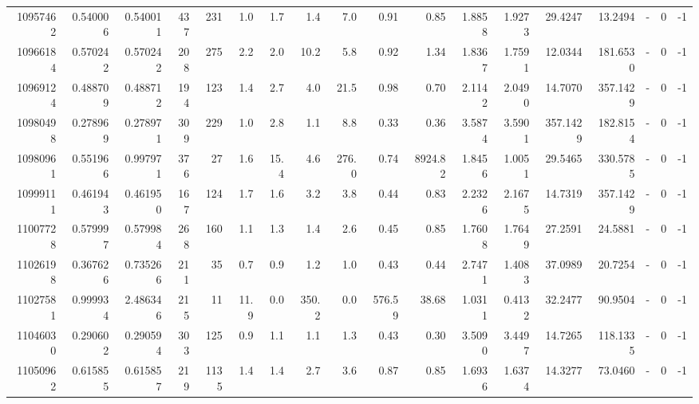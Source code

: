 \begin{tabular}{rrrrrrrrrrrrrrrlrr}
  10957462 & 0.540006 &   0.540011 &  437 &  231 &      1.0 &      1.7 &     1.4 &      7.0 &       0.91 &        0.85 &  1.8858 &  1.9273 &   29.4247 &   13.2494 &             - &        0 &         -1 \\
  10966184 & 0.570242 &   0.570242 &  208 &  275 &      2.2 &      2.0 &    10.2 &      5.8 &       0.92 &        1.34 &  1.8367 &  1.7591 &   12.0344 &  181.6530 &             - &        0 &         -1 \\
  10969124 & 0.488709 &   0.488712 &  194 &  123 &      1.4 &      2.7 &     4.0 &     21.5 &       0.98 &        0.70 &  2.1142 &  2.0490 &   14.7070 &  357.1429 &             - &        0 &         -1 \\
  10980498 & 0.278969 &   0.278971 &  309 &  229 &      1.0 &      2.8 &     1.1 &      8.8 &       0.33 &        0.36 &  3.5874 &  3.5901 &  357.1429 &  182.8154 &             - &        0 &         -1 \\
  10980961 & 0.551966 &   0.997971 &  376 &   27 &      1.6 &     15.4 &     4.6 &    276.0 &       0.74 &     8924.82 &  1.8456 &  1.0051 &   29.5465 &  330.5785 &             - &        0 &         -1 \\
  10999111 & 0.461943 &   0.461950 &  167 &  124 &      1.7 &      1.6 &     3.2 &      3.8 &       0.44 &        0.83 &  2.2326 &  2.1675 &   14.7319 &  357.1429 &             - &        0 &         -1 \\
  11007728 & 0.579997 &   0.579984 &  268 &  160 &      1.1 &      1.3 &     1.4 &      2.6 &       0.45 &        0.85 &  1.7608 &  1.7649 &   27.2591 &   24.5881 &             - &        0 &         -1 \\
  11026198 & 0.367626 &   0.735266 &  211 &   35 &      0.7 &      0.9 &     1.2 &      1.0 &       0.43 &        0.44 &  2.7471 &  1.4083 &   37.0989 &   20.7254 &             - &        0 &         -1 \\
  11027581 & 0.999934 &   2.486346 &  215 &   11 &     11.9 &      0.0 &   350.2 &      0.0 &     576.59 &       38.68 &  1.0311 &  0.4132 &   32.2477 &   90.9504 &             - &        0 &         -1 \\
  11046030 & 0.290602 &   0.290594 &  303 &  125 &      0.9 &      1.1 &     1.1 &      1.3 &       0.43 &        0.30 &  3.5090 &  3.4497 &   14.7265 &  118.1335 &             - &        0 &         -1 \\
  11050962 & 0.615855 &   0.615857 &  219 & 1135 &      1.4 &      1.4 &     2.7 &      3.6 &       0.87 &        0.85 &  1.6936 &  1.6374 &   14.3277 &   73.0460 &             - &        0 &         -1 \\

\end{tabular}
